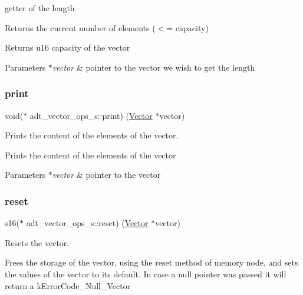 getter of the length 

Returns the current number of elements ($<$= capacity)

\begin{DoxyReturn}{Returns}
u16 capacity of the vector 
\end{DoxyReturn}

\begin{DoxyParams}{Parameters}
{\em $\ast$vector} & pointer to the vector we wish to get the length \\
\hline
\end{DoxyParams}
\mbox{\label{structadt__vector__ops__s_a6a5f161eff2bf72f51ffb3587acb9f37}} 
\subsubsection{\texorpdfstring{print}{print}}
{\footnotesize\ttfamily void($\ast$ adt\+\_\+vector\+\_\+ops\+\_\+s\+::print) (\hyperlink{structadt__vector__s}{Vector} $\ast$vector)}



Prints the content of the elements of the vector. 

Prints the content of the elements of the vector


\begin{DoxyParams}{Parameters}
{\em $\ast$vector} & pointer to the vector \\
\hline
\end{DoxyParams}
\mbox{\label{structadt__vector__ops__s_a9bdc338084206d5f78e2512d276f8bff}} 
\subsubsection{\texorpdfstring{reset}{reset}}
{\footnotesize\ttfamily s16($\ast$ adt\+\_\+vector\+\_\+ops\+\_\+s\+::reset) (\hyperlink{structadt__vector__s}{Vector} $\ast$vector)}



Resets the vector. 

Frees the storage of the vector, using the reset method of memory node, and sets the values of the vector to it\textquotesingle{}s default. In case a null pointer was passed it will return a k\+Error\+Code\+\_\+\+Null\+\_\+\+Vector

